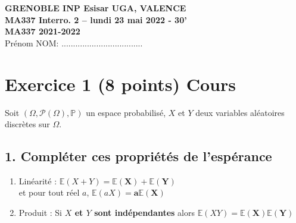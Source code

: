 \documentclass[11pt,a4paper]{article}
\begin{document}
\begin{center}
    \textbf{GRENOBLE INP Esisar UGA, VALENCE} \\
    \textbf{MA337 Interro. 2 -- lundi 23 mai 2022 - 30'} \\
    \textbf{MA337 2021-2022} \\
    Prénom NOM: ...................................
\end{center}

\vspace{0.5cm}

\section*{Exercice 1 (8 points) Cours}
Soit $(\Omega,\mathcal{P}(\Omega),\mathbb{P})$ un espace probabilisé, $X$ et $Y$ deux variables aléatoires discrètes sur $\Omega$.

\subsection*{1. Compléter ces propriétés de l'espérance}
\begin{enumerate}
    \item[(a)] Linéarité : $\mathbb{E}(X+Y) = \mathbf{\mathbb{E}(X) + \mathbb{E}(Y)}$ \\
    et pour tout réel $a$, $\mathbb{E}(aX) = \mathbf{a\mathbb{E}(X)}$
    \item[(b)] Produit : Si \textbf{$X$ et $Y$ sont indépendantes} alors $\mathbb{E}(XY) = \mathbf{\mathbb{E}(X)\mathbb{E}(Y)}$
\end{enumerate}
\end{document}
